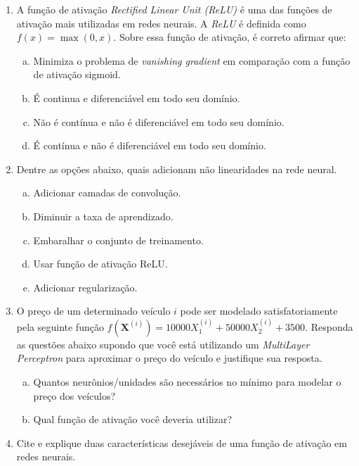 \documentclass{dlproblemset}
\begin{document}
\begin{enumerate}[1)]
    \item A função de ativação \textit{Rectified Linear Unit (ReLU)} é uma das funções de ativação mais utilizadas em redes neurais. A \textit{ReLU} é definida como $f(x) = \max(0,x)$. Sobre essa função de ativação, é correto afirmar que:
    \begin{enumerate}[(a)]
	    \item Minimiza o problema de \textit{vanishing gradient} em comparação com a função de ativação sigmoid.
	    \item É continua e diferenciável em todo seu domínio.
	    \item Não é contínua e não é diferenciável em todo seu domínio.
	    \item É contínua e não é diferenciável em todo seu domínio.
    \end{enumerate}

    \item Dentre as opções abaixo, quais adicionam não linearidades na rede neural.

    \begin{enumerate}[(a)]
        \item Adicionar camadas de convolução.
        \item Diminuir a taxa de aprendizado.
        \item Embaralhar o conjunto de treinamento.
        \item Usar função de ativação ReLU.
        \item Adicionar regularização.
    \end{enumerate}

    \item O preço de um determinado veículo $i$ pode ser modelado satisfatoriamente pela seguinte função $f(\mathbf{X}^{(i)}) = 10000 X^{(i)}_{1} + 50000 X^{(i)}_{2} + 3500$. Responda as questões abaixo supondo que você está utilizando um \textit{MultiLayer Perceptron} para aproximar o preço do veículo e justifique sua resposta.
    \begin{enumerate}[(a)]
	    \item Quantos neurônios/unidades são necessários no mínimo para modelar o preço dos veículos?
	    \item Qual função de ativação você deveria utilizar?
    \end{enumerate}

    \item Cite e explique duas características desejáveis de uma função de ativação em redes neurais.


\end{enumerate}
\end{document}
